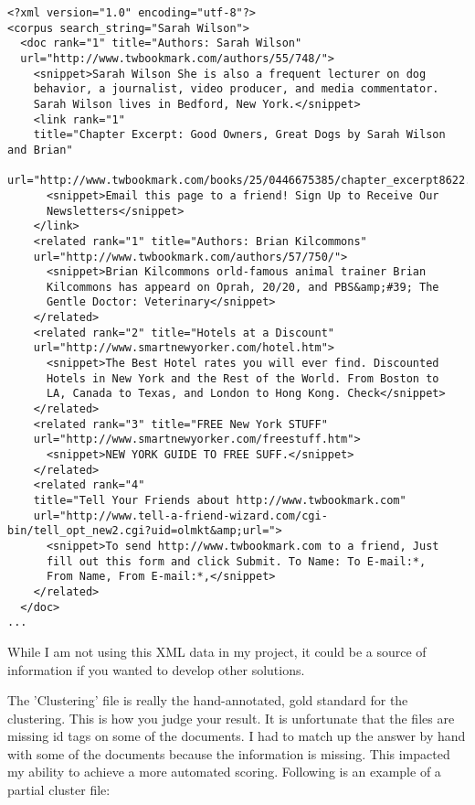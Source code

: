 \documentclass[12pt,twoside,letterpaper]{article}
\begin{document}
\begin{verbatim}
<?xml version="1.0" encoding="utf-8"?>
<corpus search_string="Sarah Wilson">
  <doc rank="1" title="Authors: Sarah Wilson"
  url="http://www.twbookmark.com/authors/55/748/">
    <snippet>Sarah Wilson She is also a frequent lecturer on dog
    behavior, a journalist, video producer, and media commentator.
    Sarah Wilson lives in Bedford, New York.</snippet>
    <link rank="1"
    title="Chapter Excerpt: Good Owners, Great Dogs by Sarah Wilson and Brian"
    url="http://www.twbookmark.com/books/25/0446675385/chapter_excerpt8622.html">
      <snippet>Email this page to a friend! Sign Up to Receive Our
      Newsletters</snippet>
    </link>
    <related rank="1" title="Authors: Brian Kilcommons"
    url="http://www.twbookmark.com/authors/57/750/">
      <snippet>Brian Kilcommons orld-famous animal trainer Brian
      Kilcommons has appeard on Oprah, 20/20, and PBS&amp;#39; The
      Gentle Doctor: Veterinary</snippet>
    </related>
    <related rank="2" title="Hotels at a Discount"
    url="http://www.smartnewyorker.com/hotel.htm">
      <snippet>The Best Hotel rates you will ever find. Discounted
      Hotels in New York and the Rest of the World. From Boston to
      LA, Canada to Texas, and London to Hong Kong. Check</snippet>
    </related>
    <related rank="3" title="FREE New York STUFF"
    url="http://www.smartnewyorker.com/freestuff.htm">
      <snippet>NEW YORK GUIDE TO FREE SUFF.</snippet>
    </related>
    <related rank="4"
    title="Tell Your Friends about http://www.twbookmark.com"
    url="http://www.tell-a-friend-wizard.com/cgi-bin/tell_opt_new2.cgi?uid=olmkt&amp;url=">
      <snippet>To send http://www.twbookmark.com to a friend, Just
      fill out this form and click Submit. To Name: To E-mail:*,
      From Name, From E-mail:*,</snippet>
    </related>
  </doc>
...
\end{verbatim}

While I am not using this XML data in my project, it could be a source of information if you wanted to develop other solutions.

The 'Clustering' file is really the hand-annotated, gold standard for the clustering. This is how you judge your result. It is unfortunate that the files are missing id tags on some of the documents. I had to match up the answer by hand with some of the documents because the information is missing. This impacted my ability to achieve a more automated scoring. Following is an example of a partial cluster file: 
\end{document}

